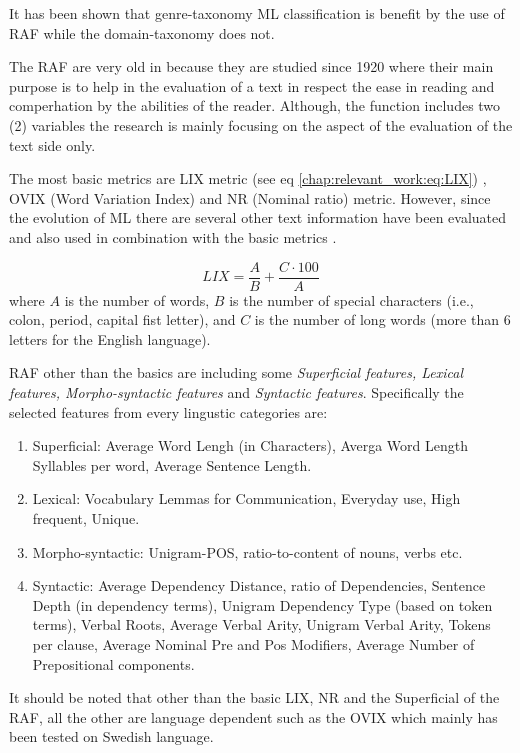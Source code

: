 It has been shown that genre-taxonomy ML classification is benefit by the use of RAF while the domain-taxonomy does not. 

The RAF are very old in because they are studied since 1920 where their main purpose is to help in the evaluation of a text in respect the ease in reading and comperhation by the abilities of the reader. Although, the function includes two (2) variables the research is mainly focusing on the aspect of the evaluation of the text side only. 

The most basic metrics are LIX metric (see eq \ref{chap:relevant_work:eq:LIX}) , OVIX (Word Variation Index) and NR (Nominal ratio) metric. However, since the evolution of ML there are several other text information have been evaluated and also used in combination with the basic metrics \parencite{falkenjack2013features}.

\begin{equation} \label{chap:relevant_work:eq:LIX}
	LIX = \frac{A}{B} + \frac{C \cdot 100}{A}
\end{equation}
\nointend where $A$ is the number of words, $B$ is the number of special characters (i.e., colon, period, capital fist letter), and $C$ is the number of long words (more than 6 letters for the English language). 

RAF other than the basics are including some \textit{Superficial features, Lexical features, Morpho-syntactic features} and \textit{Syntactic features}. Specifically the selected features from every lingustic categories are:

\begin{enumerate}
\item Superficial: Average Word Lengh (in Characters), Averga Word Length Syllables per word, Average Sentence Length.
\item Lexical: Vocabulary Lemmas for Communication, Everyday use, High frequent, Unique.
\item Morpho-syntactic: Unigram-POS, ratio-to-content of nouns, verbs etc.
\item Syntactic: Average Dependency Distance, ratio of Dependencies, Sentence Depth (in dependency terms), Unigram Dependency Type (based on token terms), Verbal Roots, Average Verbal Arity, Unigram Verbal Arity, Tokens per clause, Average Nominal Pre and Pos Modifiers, Average Number of Prepositional components.
\end{enumerate}

It should be noted that other than the basic LIX, NR and the Superficial of the RAF, all the other are language dependent such as the OVIX which mainly has been tested on Swedish language.

